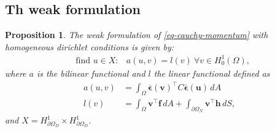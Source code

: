 \documentclass[11pt,a4paper,english]{elsarticle}%
\newtheorem{proposition}[theorem]{Proposition}
\begin{document}
\subsection{Th weak formulation}
\begin{proposition}
    The weak formulation of \eqref{eq-cauchy-momentum} with homogeneous dirichlet conditions is given by:  
    \begin{equation*}
        \begin{aligned}
        &\text{find } u \in X : 
        &a(u,v) = l(v) \ \forall v \in H_0^{1}(\Omega), 
        \end{aligned}
    \end{equation*}
    where $a$ is the bilinear functional and $l$ the linear functional defined as 
    \begin{equation*}
        \begin{aligned}
            a(u,v) &= \int_{\Omega} \boldsymbol{\overline \epsilon}(\boldsymbol v)^\intercal C\boldsymbol{\overline \epsilon}(\boldsymbol u)  \, dA
            \\
            l(v) &= \int_\Omega{\boldsymbol{v}^\intercal \boldsymbol{f}} \,dA  + \int_{\partial \Omega_N}{\boldsymbol{v}^\intercal \boldsymbol h} \,dS,
        \end{aligned}
    \end{equation*}
    and $ X=   H^1_{\partial \Omega_D } \times H^1_{\partial \Omega_D } $.
\end{proposition}
\end{document}
